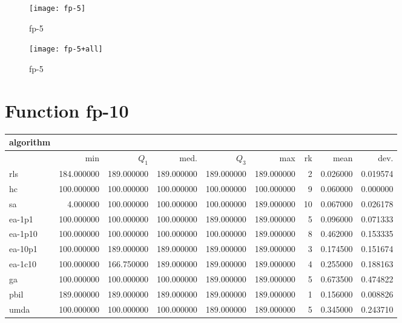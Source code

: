 \begin{center}
\begin{figure}[h]
\centering
\texttt{[image: fp-5]}
\caption{fp-5}
\end{figure}
\end{center}

\begin{center}
\begin{figure}[h]
\centering
\texttt{[image: fp-5+all]}
\caption{fp-5}
\end{figure}
\end{center}

\newpage

\section{Function fp-10}
\begin{center}
\begin{tabular}{@{}l*{5}{>{{}}N{3}{0}}>{{}}N{2}{0}N{1}{3}N{1}{3}@{}}
\toprule
{algorithm} &  &  \\
\midrule
& {min} & {$Q_1$} & {med.} & {$Q_3$} & {max} & {rk} & {mean} & {dev.} \\
\midrule
rls & 184.000000 & {\color{blue}} 189.000000 & {\color{blue}} 189.000000 & {\color{blue}} 189.000000 & {\color{blue}} 189.000000 & 2 & 0.026000 & 0.019574 \\
 hc & 100.000000 & 100.000000 & 100.000000 & 100.000000 & 100.000000 & 9 & 0.060000 & 0.000000 \\
 sa & 4.000000 & 100.000000 & 100.000000 & 100.000000 & {\color{blue}} 189.000000 & 10 & 0.067000 & 0.026178 \\
 ea-1p1 & 100.000000 & 100.000000 & 100.000000 & {\color{blue}} 189.000000 & {\color{blue}} 189.000000 & 5 & 0.096000 & 0.071333 \\
 ea-1p10 & 100.000000 & 100.000000 & 100.000000 & 100.000000 & {\color{blue}} 189.000000 & 8 & 0.462000 & 0.153335 \\
 ea-10p1 & 100.000000 & {\color{blue}} 189.000000 & {\color{blue}} 189.000000 & {\color{blue}} 189.000000 & {\color{blue}} 189.000000 & 3 & 0.174500 & 0.151674 \\
 ea-1c10 & 100.000000 & 166.750000 & {\color{blue}} 189.000000 & {\color{blue}} 189.000000 & {\color{blue}} 189.000000 & 4 & 0.255000 & 0.188163 \\
 ga & 100.000000 & 100.000000 & 100.000000 & {\color{blue}} 189.000000 & {\color{blue}} 189.000000 & 5 & 0.673500 & 0.474822 \\
 pbil & {\color{blue}} 189.000000 & {\color{blue}} 189.000000 & {\color{blue}} 189.000000 & {\color{blue}} 189.000000 & {\color{blue}} 189.000000 & 1 & 0.156000 & 0.008826 \\
 umda & 100.000000 & 100.000000 & 100.000000 & {\color{blue}} 189.000000 & {\color{blue}} 189.000000 & 5 & 0.345000 & 0.243710 \\
 \bottomrule
\end{tabular}
\end{center}

